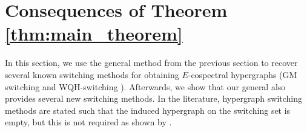 \documentclass[12pt]{article}
\numberwithin{equation}{section}
\theoremstyle{definition}
\newcommand{\ev}[1]{( #1 )}
\begin{document}

\section{Consequences of Theorem \ref{thm:main_theorem}}
\label{sec:conseqs}
In this section, we use the general method from the previous section to recover several known switching methods for obtaining $E$-cospectral hypergraphs (GM switching \cite{bzw2014} and WQH-switching \cite{abiad_khramova}). Afterwards, we show that our general  also provides several new switching methods. In the literature, hypergraph switching methods are stated such that the induced hypergraph on the switching set is empty, but this is not required as shown by .
\end{document}
